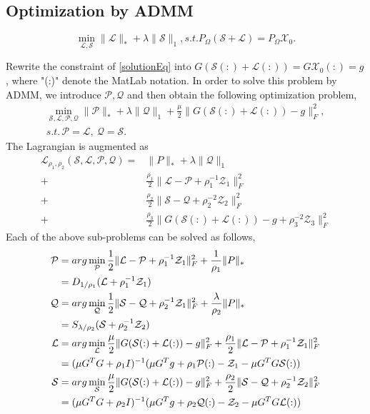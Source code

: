 \documentclass[journal,transmag]{IEEEtran}
\theoremstyle{plain}
\begin{document}
\subsection{Optimization by ADMM}

\begin{equation}
\min_{\mathcal{L},\mathcal{S}}\|\mathcal{L}\|_*+\lambda \|\mathcal{S}\|_1, s.t. P_{\Omega}(\mathcal{S+L})=P_{\Omega}\mathcal{X}_0.
\end{equation}

Rewrite the constraint of \ref{solutionEq} into $G\mathcal{(S(:)+L(:))}=G\mathcal{X}_0(:)=g$, where "(:)" denote the MatLab notation. In order to solve this problem by ADMM, we introduce $\mathcal{P}, \mathcal{Q}$ and then obtain the following optimization problem,
\begin{align*}
 \min_{\mathcal{S},\mathcal{L},\mathcal{P},\mathcal{Q}}\|\mathcal{P}
\|_*+\lambda \|\mathcal{Q}\|_1+\frac{\mu}{2}\|G\mathcal{(S(:)+L(:))}-g\|_{F}^2,\\
 s.t.\, \mathcal{P=L,~Q=S}.
\end{align*}
The Lagrangian is augmented as
\begin{align*}
\mathcal{L}_{\rho_1,\rho_2}(\mathcal{S},\mathcal{L},\mathcal{P},\mathcal{Q})
=&\|P\|_*+\lambda \|\mathcal{Q}\|_1\\
+&\frac{\rho_1}{2}\|\mathcal{L-P}+\rho_1^{-1}\mathcal{Z}_1\|_{F}^2\\
+&\frac{\rho_2}{2}\|\mathcal{S-Q}+\rho_2^{-2}\mathcal{Z}_2\|_{F}^2\\
+&\frac{\rho_3}{2}\|G\mathcal{(S(:)+L(:))}-g+\rho_3^{-2}\mathcal{Z}_3\|_{F}^2
\end{align*}
Each of the above sub-problems can be solved as follows,
\begin{align*}
\mathcal{P}
&=arg\min_{\mathcal{P}}\frac{1}{2}\|\mathcal{L-P}+\rho_1^{-1}\mathcal{Z}_1\|_F^2
 +\frac{1}{\rho_1}\|P\|_*\notag\\
&=D_{1/\rho_1}(\mathcal{L}+\rho_1^{-1}\mathcal{Z}_1)\\
\mathcal{Q}
&=arg\min_{\mathcal{Q}}\frac{1}{2}\|\mathcal{S-Q}+\rho_2^{-1}\mathcal{Z}_1\|_F^2
 +\frac{\lambda}{\rho_2}\|P\|_*\notag\\
&=S_{\lambda/\rho_2}(\mathcal{S}+\rho_2^{-1}\mathcal{Z}_2)\\
\mathcal{L}
&=arg\min_{\mathcal{L}}\frac{\mu}{2}\|G\mathcal{(S(:)+L(:))}-g\|_{F}^2
 +\frac{\rho_1}{2}\|\mathcal{L-P}+\rho_1^{-1}\mathcal{Z}_1\|_{F}^2\notag\\
&=(\mu G^TG+\rho_1I)^{-1}(\mu G^T g+\rho_1\mathcal{P}(:)-\mathcal{Z}_1
 -\mu G^TG\mathcal{S}(:))\\
\mathcal{S}
&=arg\min_{\mathcal{S}}\frac{\mu}{2}\|G\mathcal{(S(:)+L(:))}-g\|_{F}^2
 +\frac{\rho_2}{2}\|\mathcal{S-Q}+\rho_2^{-1}\mathcal{Z}_2\|_{F}^2\notag\\
&=(\mu G^TG+\rho_2I)^{-1}(\mu G^T g+\rho_2\mathcal{Q}(:)-\mathcal{Z}_2
 -\mu G^TG\mathcal{L}(:))
\end{align*}
\end{document}
